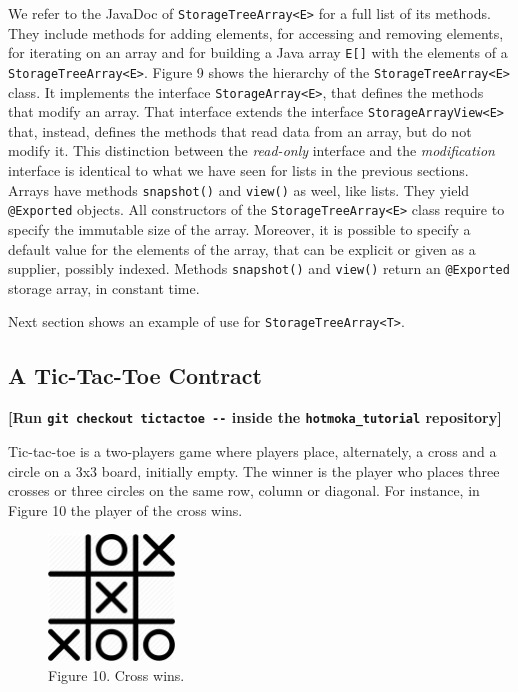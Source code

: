 \documentclass[a4paper,]{book}
\begin{document}
{We refer to the JavaDoc of
\texttt{StorageTreeArray\textless{}E\textgreater{}} for a full list of
its methods. They include methods for adding elements, for accessing and
removing elements, for iterating on an array and for building a Java
array \texttt{E{[}{]}} with the elements of a
\texttt{StorageTreeArray\textless{}E\textgreater{}}. Figure 9 shows the
hierarchy of the \texttt{StorageTreeArray\textless{}E\textgreater{}}
class. It implements the interface
\texttt{StorageArray\textless{}E\textgreater{}}, that defines the
methods that modify an array. That interface extends the interface
\texttt{StorageArrayView\textless{}E\textgreater{}} that, instead,
defines the methods that read data from an array, but do not modify it.
This distinction between the \emph{read-only} interface and the
\emph{modification} interface is identical to what we have seen for
lists in the previous sections. Arrays have methods \texttt{snapshot()}
and \texttt{view()} as weel, like lists. They yield \texttt{@Exported}
objects. All constructors of the
\texttt{StorageTreeArray\textless{}E\textgreater{}} class require to
specify the immutable size of the array. Moreover, it is possible to
specify a default value for the elements of the array, that can be
explicit or given as a supplier, possibly indexed. Methods
\texttt{snapshot()} and \texttt{view()} return an \texttt{@Exported}
storage array, in constant time.

Next section shows an example of use for
\texttt{StorageTreeArray\textless{}T\textgreater{}}.

\hypertarget{a-tic-tac-toe-contract}{%
\subsection{A Tic-Tac-Toe Contract }\label{a-tic-tac-toe-contract}}

\textbf{{[}Run \texttt{git\ checkout\ tictactoe\ -\/-} inside the
\texttt{hotmoka\_tutorial} repository{]}}

Tic-tac-toe is a two-players game where players place, alternately, a
cross and a circle on a 3x3 board, initially empty. The winner is the
player who places three crosses or three circles on the same row, column
or diagonal. For instance, in Figure 10 the player of the cross wins.

\begin{figure}
\centering
\includegraphics[width=0.3\textwidth,height=\textheight]{pics/tictactoe_wins.png}
\caption{Figure 10. Cross wins.}
\end{figure}

}
\end{document}
